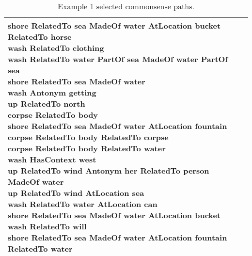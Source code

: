 \documentclass[11pt,a4paper]{article}
\begin{document}
\begin{table*}[!b]
\begin{small}
\begin{tabular}{|p{}|p{}|}
{shore  RelatedTo  sea  MadeOf  water  AtLocation  bucket  RelatedTo  horse\\
wash  RelatedTo  clothing\\
wash  RelatedTo  water  PartOf  sea  MadeOf  water  PartOf  sea\\
shore  RelatedTo  sea  MadeOf  water\\
wash  Antonym  getting\\
\textbf{up  RelatedTo  north}\\
\textbf{corpse  RelatedTo  body}\\
shore  RelatedTo  sea  MadeOf  water  AtLocation  fountain\\
corpse  RelatedTo  body  RelatedTo  corpse\\
corpse  RelatedTo  body  RelatedTo  water\\
wash  HasContext  west\\
up  RelatedTo  wind  Antonym  her  RelatedTo  person  MadeOf  water\\
up  RelatedTo  wind  AtLocation  sea\\
wash  RelatedTo  water  AtLocation  can\\
shore  RelatedTo  sea  MadeOf  water  AtLocation  bucket\\
wash  RelatedTo  will\\
shore  RelatedTo  sea  MadeOf  water  AtLocation  fountain  RelatedTo  water
    } \\
    \hline
  \end{tabular}
 \caption{Example 1 selected commonsense paths.}
 \label{tab:extractedex1}
\end{small}

\end{table*}
\end{document}
